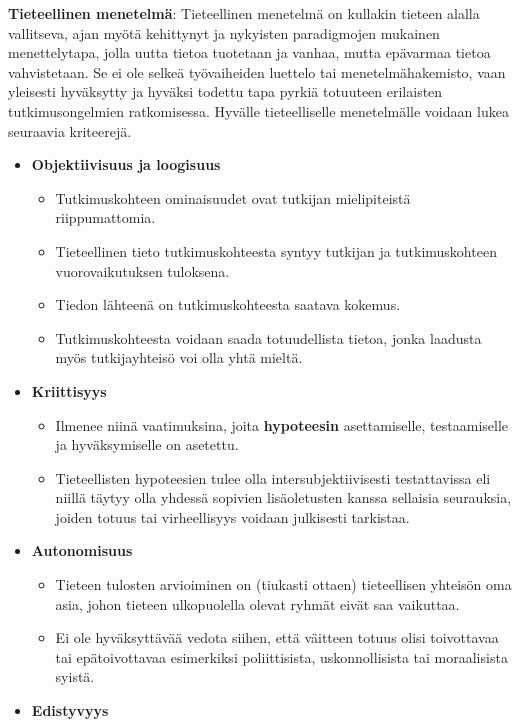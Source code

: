 \documentclass[
]{book}
\providecommand{\tightlist}{%
  \setlength{\itemsep}{0pt}\setlength{\parskip}{0pt}}
\begin{document}
\begin{defblock}{}

\textbf{Tieteellinen menetelmä}: Tieteellinen menetelmä on kullakin tieteen alalla vallitseva, ajan myötä kehittynyt ja nykyisten paradigmojen mukainen menettelytapa, jolla uutta tietoa tuotetaan ja vanhaa, mutta epävarmaa tietoa vahvistetaan. Se ei ole selkeä työvaiheiden luettelo tai menetelmähakemisto, vaan yleisesti hyväksytty ja hyväksi todettu tapa pyrkiä totuuteen erilaisten tutkimusongelmien ratkomisessa. Hyvälle tieteelliselle menetelmälle voidaan lukea seuraavia kriteerejä.

\begin{itemize}
\tightlist
\item
  \textbf{Objektiivisuus ja loogisuus}

  \begin{itemize}
  \tightlist
  \item
    Tutkimuskohteen ominaisuudet ovat tutkijan mielipiteistä riippumattomia.
  \item
    Tieteellinen tieto tutkimuskohteesta syntyy tutkijan ja tutkimuskohteen vuorovaikutuksen tuloksena.
  \item
    Tiedon lähteenä on tutkimuskohteesta saatava kokemus.
  \item
    Tutkimuskohteesta voidaan saada totuudellista tietoa, jonka laadusta myös tutkijayhteisö voi olla yhtä mieltä.
  \end{itemize}
\item
  \textbf{Kriittisyys}

  \begin{itemize}
  \tightlist
  \item
    Ilmenee niinä vaatimuksina, joita \textbf{hypoteesin} asettamiselle, testaamiselle ja hyväksymiselle on asetettu.
  \item
    Tieteellisten hypoteesien tulee olla intersubjektiivisesti testattavissa eli niillä täytyy olla yhdessä sopivien lisäoletusten kanssa sellaisia seurauksia, joiden totuus tai virheellisyys voidaan julkisesti tarkistaa.
  \end{itemize}
\item
  \textbf{Autonomisuus}

  \begin{itemize}
  \tightlist
  \item
    Tieteen tulosten arvioiminen on (tiukasti ottaen) tieteellisen yhteisön oma asia, johon tieteen ulkopuolella olevat ryhmät eivät saa vaikuttaa.
  \item
    Ei ole hyväksyttävää vedota siihen, että väitteen totuus olisi toivottavaa tai epätoivottavaa esimerkiksi poliittisista, uskonnollisista tai moraalisista syistä.
  \end{itemize}
\item
  \textbf{Edistyvyys}


\end{itemize}
\end{defblock}
\end{document}
